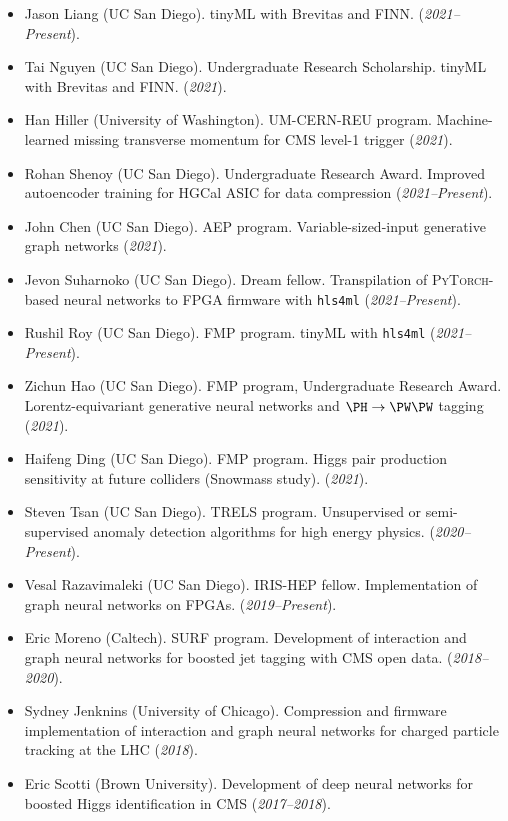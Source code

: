 \documentclass[11pt]{res}
\begin{document}
\begin{resume}
\begin{itemize}
    \item Jason Liang (UC San Diego). tinyML with Brevitas and FINN. (\textit{2021--Present}).
    \item Tai Nguyen (UC San Diego). Undergraduate Research Scholarship. tinyML with Brevitas and FINN. (\textit{2021}).
    \item Han Hiller (University of Washington). UM-CERN-REU program. Machine-learned missing transverse momentum for CMS level-1 trigger (\textit{2021}).
    \item Rohan Shenoy (UC San Diego). Undergraduate Research Award. Improved autoencoder training for HGCal ASIC for data compression (\textit{2021--Present}).
    \item John Chen (UC San Diego). AEP program. Variable-sized-input generative graph networks (\textit{2021}).
    \item Jevon Suharnoko (UC San Diego). Dream fellow. Transpilation of \textsc{PyTorch}-based neural networks to FPGA firmware with \texttt{hls4ml} (\textit{2021--Present}).
    \item Rushil Roy (UC San Diego). FMP program. tinyML with \texttt{hls4ml} (\textit{2021--Present}).
    \item Zichun Hao (UC San Diego). FMP program, Undergraduate Research Award. Lorentz-equivariant generative neural networks and $\PH\to\PW\PW$ tagging (\textit{2021}).
    \item Haifeng Ding (UC San Diego). FMP program. Higgs pair production sensitivity at future colliders (Snowmass study). (\textit{2021}).
    \item Steven Tsan (UC San Diego). TRELS program. Unsupervised or semi-supervised anomaly detection algorithms for high energy physics. (\textit{2020--Present}).
    \item Vesal Razavimaleki (UC San Diego). IRIS-HEP fellow. Implementation of graph neural networks on FPGAs. (\textit{2019--Present}).
    \item Eric Moreno (Caltech). SURF program. Development of interaction and graph neural networks for boosted jet tagging with CMS open data. (\textit{2018--2020}).
    \item Sydney Jenknins (University of Chicago). Compression and firmware implementation of interaction and graph neural networks for charged particle tracking at the LHC (\textit{2018}).
    \item Eric Scotti (Brown University). Development of deep neural networks for boosted Higgs identification in CMS (\textit{2017--2018}).
\end{itemize}
\end{resume}
\end{document}
